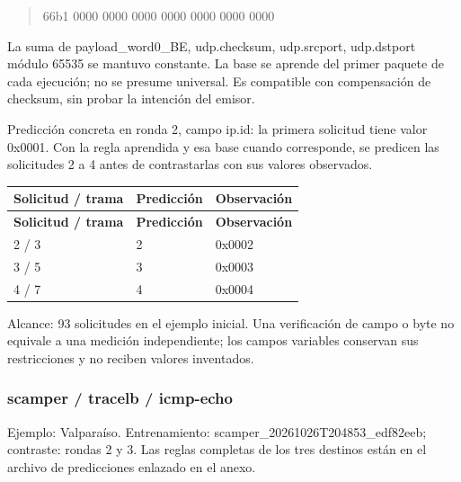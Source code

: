 \begin{quote}\ttfamily\footnotesize\raggedright 66b1 0000 0000 0000 0000 0000 0000 0000\end{quote}
La suma de payload\_\allowbreak{}word0\_\allowbreak{}BE, udp.checksum, udp.srcport, udp.dstport módulo 65535 se mantuvo constante. La base se aprende del primer paquete de cada ejecución; no se presume universal. Es compatible con compensación de checksum, sin probar la intención del emisor.

Predicción concreta en ronda 2, campo ip.id: la primera solicitud tiene valor 0x0001. Con la regla aprendida y esa base cuando corresponde, se predicen las solicitudes 2 a 4 antes de contrastarlas con sus valores observados.

\begingroup
\fontsize{9}{11}\selectfont
\addtocounter{table}{-1}
\begin{longtable}{p{3.2cm}p{5.1cm}p{5.1cm}}
\toprule
\textbf{Solicitud / trama} & \textbf{Predicción} & \textbf{Observación} \\ \midrule
\endfirsthead
\toprule
\textbf{Solicitud / trama} & \textbf{Predicción} & \textbf{Observación} \\ \midrule
\endhead
2 / 3 & 2 & 0x0002 \\
3 / 5 & 3 & 0x0003 \\
4 / 7 & 4 & 0x0004 \\
\bottomrule
\end{longtable}
\endgroup
Alcance: 93 solicitudes en el ejemplo inicial. Una verificación de campo o byte no equivale a una medición independiente; los campos variables conservan sus restricciones y no reciben valores inventados.

\subsubsection{scamper / tracelb / icmp-echo}
Ejemplo: Valparaíso. Entrenamiento: scamper\_\allowbreak{}20261026T204853\_\allowbreak{}edf82eeb; contraste: rondas 2 y 3. Las reglas completas de los tres destinos están en el archivo de predicciones enlazado en el anexo.

